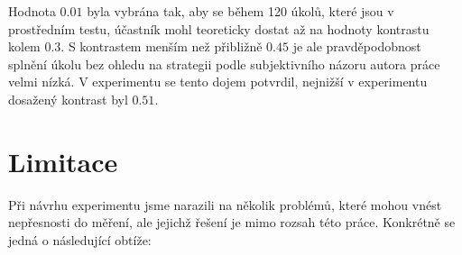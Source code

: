 Hodnota $0.01$ byla vybrána tak, aby se během 120 úkolů, které jsou v
prostředním testu, účastník mohl teoreticky dostat až na hodnoty kontrastu
kolem $0.3$. S kontrastem menším než přibližně $0.45$ je ale pravděpodobnost
splnění úkolu bez ohledu na strategii podle subjektivního názoru autora práce
velmi nízká. V experimentu se tento dojem potvrdil, nejnižší v experimentu
dosažený kontrast byl $0.51$.



\section{Limitace}

Při návrhu experimentu jsme narazili na několik problémů, které mohou vnést
nepřesnosti do měření, ale jejichž řešení je mimo rozsah této práce. Konkrétně
se jedná o následující obtíže:

